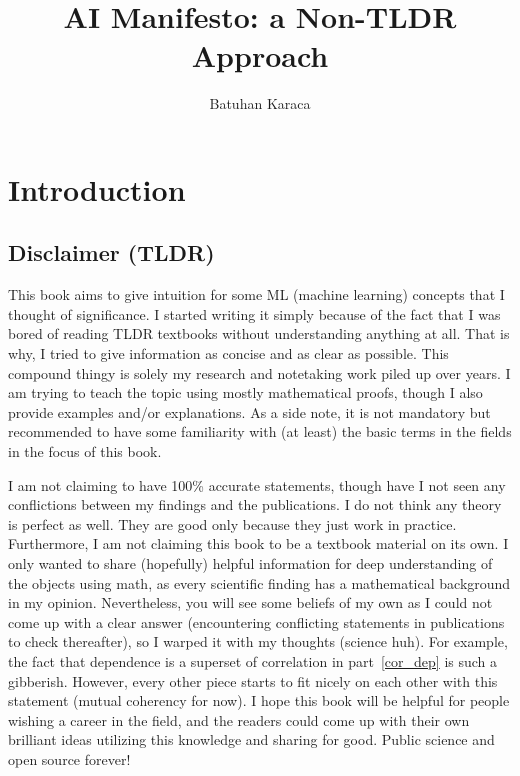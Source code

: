 \documentclass{book}
\title{AI Manifesto: a Non-TLDR Approach}
\author{Batuhan Karaca}
\numberwithin{equation}{subsection}
\begin{document}
\maketitle
\tableofcontents
\chapter{Introduction}
\section{Disclaimer (TLDR)}
This book aims to give intuition for some ML (machine learning) concepts that I thought of significance. I started writing it simply because of the fact that I was bored of reading TLDR textbooks without understanding anything at all. That is why, I tried to give information as concise and as clear as possible. This compound thingy is solely my research and notetaking work piled up over years. I am trying to teach the topic using mostly mathematical proofs, though I also provide examples and/or explanations. As a side note, it is not mandatory but recommended to have some familiarity with (at least) the basic terms in the fields in the focus of this book.

I am not claiming to have 100\% accurate statements, though have I not seen any conflictions between my findings and the publications. I do not think any theory is perfect as well. They are good only because they just work in practice. Furthermore, I am not claiming this book to be a textbook material on its own. I only wanted to share (hopefully) helpful information for deep understanding of the objects using math, as every scientific finding has a mathematical background in my opinion. Nevertheless, you will see some beliefs of my own as I could not come up with a clear answer (encountering conflicting statements in publications to check thereafter), so I warped it with my thoughts (science huh). For example, the fact that dependence is a superset of correlation in part~\ref{cor_dep} is such a gibberish. However, every other piece starts to fit nicely on each other with this statement (mutual coherency for now). I hope this book will be helpful for people wishing a career in the field, and the readers could come up with their own brilliant ideas utilizing this knowledge and sharing for good. Public science and open source forever!
\end{document}
